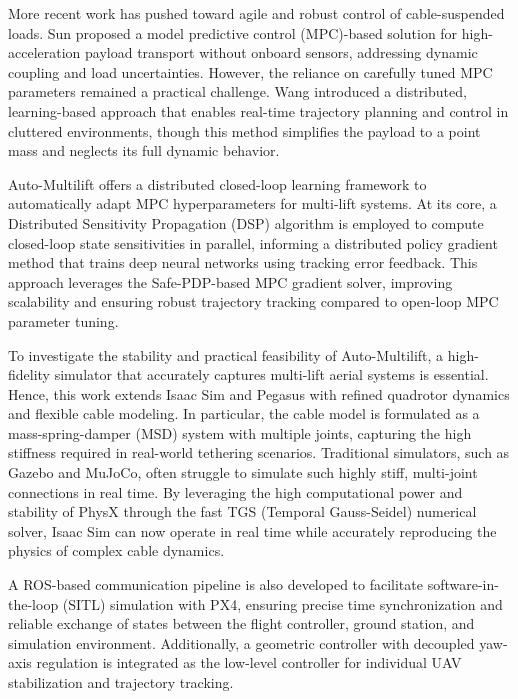 \documentclass[12pt,twoside,letterpaper]{article}
\begin{document}
More recent work has pushed toward agile and robust control of cable-suspended loads. Sun \cite{sun2025agilecooperativeaerialmanipulation} proposed a model predictive control (MPC)-based solution for high-acceleration payload transport without onboard sensors, addressing dynamic coupling and load uncertainties. However, the reliance on carefully tuned MPC parameters remained a practical challenge. Wang \cite{wang2025safeagiletransportationcablesuspended} introduced a distributed, learning-based approach that enables real-time trajectory planning and control in cluttered environments, though this method simplifies the payload to a point mass and neglects its full dynamic behavior.

Auto-Multilift \cite{multilift} offers a distributed closed-loop learning framework to automatically adapt MPC hyperparameters for multi-lift systems. At its core, a Distributed Sensitivity Propagation (DSP) algorithm is employed to compute closed-loop state sensitivities in parallel, informing a distributed policy gradient method that trains deep neural networks using tracking error feedback. This approach leverages the Safe-PDP-based MPC gradient solver, improving scalability and ensuring robust trajectory tracking compared to open-loop MPC parameter tuning.

To investigate the stability and practical feasibility of Auto-Multilift, a high-fidelity simulator that accurately captures multi-lift aerial systems is essential. Hence, this work extends Isaac Sim and Pegasus \cite{pegasus} with refined quadrotor dynamics and flexible cable modeling. In particular, the cable model is formulated as a mass-spring-damper (MSD) system with multiple joints, capturing the high stiffness required in real-world tethering scenarios. Traditional simulators, such as Gazebo and MuJoCo, often struggle to simulate such highly stiff, multi-joint connections in real time. By leveraging the high computational power and stability of PhysX through the fast TGS (Temporal Gauss-Seidel) numerical solver, Isaac Sim can now operate in real time while accurately reproducing the physics of complex cable dynamics.

A ROS-based communication pipeline is also developed to facilitate software-in-the-loop (SITL) simulation with PX4, ensuring precise time synchronization and reliable exchange of states between the flight controller, ground station, and simulation environment. Additionally, a geometric controller with decoupled yaw-axis regulation is integrated as the low-level controller for individual UAV stabilization and trajectory tracking.
\end{document}
